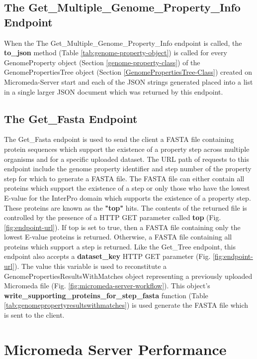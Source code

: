 \subsection{The Get\_Multiple\_Genome\_Property\_Info Endpoint}

When the The Get\_Multiple\_Genome\_Property\_Info endpoint is called, the \textbf{to\_json} method (Table \ref{tab:genome-property-object}) is called for every GenomeProperty object (Section \ref{genome-property-class}) of the GenomePropertiesTree object (Section \ref{GenomePropertiesTree-Class}) created on Micromeda-Server start and each of the JSON strings generated placed into a list in a single larger JSON document which was returned by this endpoint. 

\subsection{The Get\_Fasta Endpoint}

The Get\_Fasta endpoint is used to send the client a FASTA file containing protein sequences which support the existence of a property step across multiple organisms and for a specific uploaded dataset. The URL path of requests to this endpoint include the genome property identifier and step number of the property step for which to generate a FASTA file. The FASTA file can either contain all proteins which support the existence of a step or only those who have the lowest E-value for the InterPro domain which supports the existence of a property step. These proteins are known as the \textbf{"top"} hits. The contents of the returned file is controlled by the presence of a HTTP GET parameter called \textbf{top} (Fig. \ref{fig:endpoint-url}). If top is set to true, then a FASTA file containing only the lowest E-value proteins is returned. Otherwise, a FASTA file containing all proteins which support a step is returned. Like the Get\_Tree endpoint, this endpoint also accepts a \textbf{dataset\_key} HTTP GET parameter (Fig. \ref{fig:endpoint-url}). The value this variable is used to reconstitute a GenomePropertiesResultsWithMatches object representing a previously uploaded Micromeda file (Fig. \ref{fig:micromeda-server-workflow}). This object's \textbf{write\_supporting\_proteins\_for\_step\_fasta} function (Table \ref{tab:genomepropertyresultswithmatches}) is used generate the FASTA file which is sent to the client.

\section{Micromeda Server Performance}

